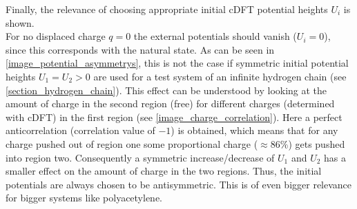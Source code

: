 Finally, the relevance of choosing appropriate initial cDFT potential heights $U_i$ is shown.\\ For no displaced charge $q = 0$ the external potentials should vanish ($U_i = 0$), since this corresponds with the natural state. As can be seen in \cref{image_potential_asymmetrys}, this is not the case if symmetric initial potential heights $U_1 = U_2 > 0$ are used for a test system of an infinite hydrogen chain (see \cref{section_hydrogen_chain}). This effect can be understood by looking at the amount of charge in the second region (free) for different charges (determined with cDFT) in the first region (see \cref{image_charge_correlation}). Here a perfect anticorrelation (correlation value of $-1$) is obtained, which means that for any charge pushed out of region one some proportional charge ($\approx 86\%$) gets pushed into region two. Consequently a symmetric increase/decrease of $U_1$ and $U_2$ has a smaller effect on the amount of charge in the two regions.  Thus, the initial potentials are always chosen to be antisymmetric. This is of even bigger relevance for bigger systems like polyacetylene.
